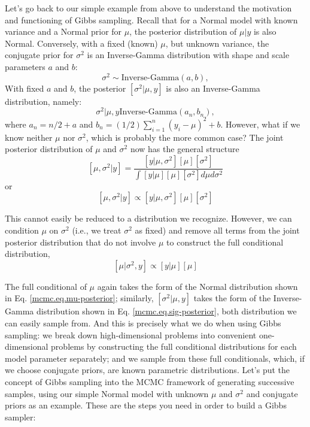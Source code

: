 Let's go back to our simple example from above to understand the
motivation and functioning of Gibbs sampling. Recall that for a Normal
model with known variance and a Normal prior for $\mu$, the posterior
distribution of $\mu|y$ is also Normal. Conversely, with a fixed
(known) $\mu$, but unknown variance, the conjugate prior for
$\sigma^2$ is an Inverse-Gamma distribution with shape and scale
parameters $a$ and $b$:
\[
\sigma^2 \sim \mbox{Inverse-Gamma}(a,b),
\]
With fixed $a$ and $b$, the posterior $[\sigma^2|\mu,y]$ is also an Inverse-Gamma distribution, namely:
\begin{equation}
\sigma^2|\mu,y \mbox{Inverse-Gamma} (a_n, b_n),
\label{mcmc.eq.sig-posterior}
\end{equation}
 where  $a_n = n/2   + a$ and $b_n = (1/2) \displaystyle\sum\limits_{i=1}^{n} (y_i-\mu)^2 + b$.
However, what if we know neither $\mu$ nor $\sigma^2$, which is probably the
more common case? The joint posterior distribution of $\mu$ and $\sigma^2$
now has the general structure
\[
[\mu, \sigma^2|y] = \frac{[y|\mu,\sigma^2] [\mu] [\sigma^2]}{ \int [y|\mu] [\mu] [\sigma^2] d\mu d\sigma^2 }
\]
or
\[
[\mu, \sigma^2|y] \propto [y|\mu, \sigma^2] [\mu] [\sigma^2]
\]

This cannot easily be reduced to a distribution we recognize. However,
we can condition $\mu$ on $\sigma^2$ (i.e., we treat $\sigma^2$ as fixed) and remove
all terms from the joint posterior distribution that do not involve $\mu$
to construct the full conditional distribution,
\[
[\mu|\sigma^2,y]  \propto [y|\mu] [\mu]
\]

The full conditional of $\mu$ again takes the form of the Normal
distribution shown in Eq. \ref{mcmc.eq.mu-posterior}; similarly, $[\sigma^2|\mu,y]$ takes
the form of the Inverse-Gamma distribution shown in
Eq. \ref{mcmc.eq.sig-posterior}, both distribution we can easily sample
from. And this is precisely what we do when using Gibbs sampling: we
break down high-dimensional problems into convenient one-dimensional
problems by constructing the full conditional distributions for each
model parameter separately; and we sample from these full
conditionals, which, if we choose conjugate priors, are known
parametric distributions.
Let's put the concept of Gibbs sampling into the MCMC framework of
generating successive samples, using our simple Normal model with
unknown $\mu$ and $\sigma^2$ and conjugate priors as an example. These are the
steps you need in order to build a Gibbs sampler:

